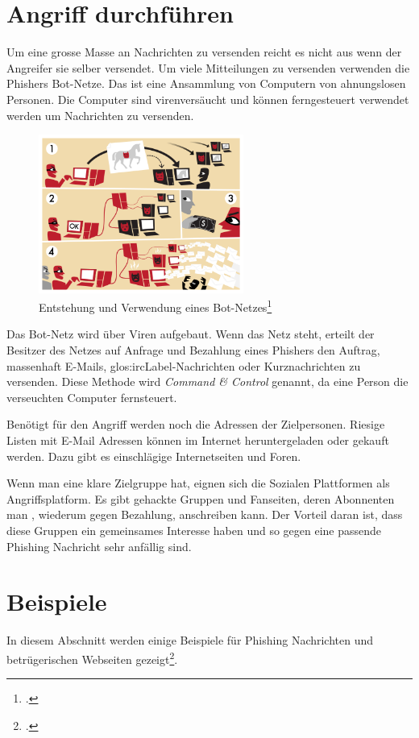 \section{Angriff durchführen}
Um eine grosse Masse an Nachrichten zu versenden reicht es nicht aus wenn der Angreifer sie selber versendet. Um viele Mitteilungen zu versenden verwenden die Phishers Bot-Netze. Das ist eine Ansammlung von Computern von ahnungslosen Personen. Die Computer sind virenversäucht und können ferngesteuert verwendet werden um Nachrichten zu versenden.
\begin{figure}[H]
  \centering
  \includegraphics[width=0.6\textwidth]{images/botnet.png}
  \caption{Entstehung und Verwendung eines Bot-Netzes\footcite{Botnet__Wikipedia_2015-05-22}}
  \label{fig:phishing:angriffdurchfueren:botnetz}
\end{figure}
Das Bot-Netz wird über Viren aufgebaut. Wenn das Netz steht, erteilt der Besitzer des Netzes auf Anfrage und Bezahlung eines Phishers den Auftrag, massenhaft E-Mails, \Gls{glos:ircLabel}-Nachrichten oder Kurznachrichten zu versenden. Diese Methode wird \textit{Command \& Control} genannt, da eine Person die verseuchten Computer fernsteuert.

Benötigt für den Angriff werden noch die Adressen der Zielpersonen. Riesige Listen mit E-Mail Adressen können im Internet heruntergeladen oder gekauft werden. Dazu gibt es einschlägige Internetseiten und Foren. 

Wenn man eine klare Zielgruppe hat, eignen sich die Sozialen Plattformen als Angriffsplatform. Es gibt gehackte Gruppen und Fanseiten, deren Abonnenten man , wiederum gegen Bezahlung, anschreiben kann. Der Vorteil daran ist, dass diese Gruppen ein gemeinsames Interesse haben und so gegen eine passende Phishing Nachricht sehr anfällig sind.

\section{Beispiele}
In diesem Abschnitt werden einige Beispiele für Phishing Nachrichten und betrügerischen Webseiten gezeigt\footcite{Was_sind_Phishing_emails_2015-05-22}.

